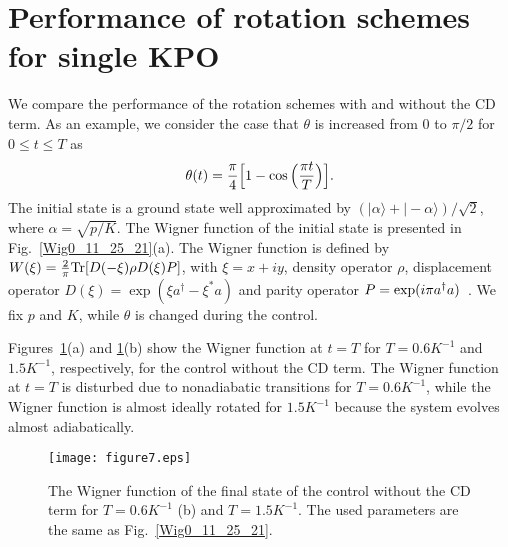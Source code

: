 \documentclass[%
 reprint,
 amsmath,amssymb,
 aps,
pra,
]{revtex4-2}
\begin{document}
\section{Performance of rotation schemes for single KPO}
\label{Rotation and disturbances due to nonadiabatic transitions}
We compare the performance of the rotation schemes with and without the CD term.
As an example, we consider the case that $\theta$ is increased from 0 to $\pi/2$ for $0\le t\le T$ as
\begin{eqnarray}
\theta(t) = \frac{\pi}{4}\Big{[} 1- \cos\Big{(} \frac{\pi t}{T} \Big{)} \Big{]}.
\label{theta0_11_29_21}
\end{eqnarray}
The initial state is a ground state well approximated by $(|\alpha\rangle + |-\alpha\rangle)/\sqrt{2}$, where $\alpha=\sqrt{p/K}$. 
The Wigner function of the initial state is presented in Fig.~\ref{Wig0_11_25_21}(a).
The Wigner function is defined by $W(\xi)=\frac{2}{\pi}{\rm Tr}[D(-\xi)\rho D(\xi)P]$, with $\xi=x+iy$, density operator $\rho$, displacement operator $D(\xi)=\exp(\xi a^\dagger - \xi^\ast a)$ and parity operator $P={\rm exp}(i\pi a^\dagger a)$~\cite{Leonhardt1997,Deleglise2008,Goto2016}.
We fix $p$ and $K$, while $\theta$ is changed during the control. %

Figures~\ref{Wig_11_25_21}(a) and \ref{Wig_11_25_21}(b) show the Wigner function at $t=T$ for $T=0.6K^{-1}$ and $1.5K^{-1}$, respectively, for the control without the CD term.
The Wigner function at $t=T$ is disturbed due to nonadiabatic transitions for $T=0.6K^{-1}$, while
the Wigner function is almost ideally rotated for $1.5K^{-1}$ because the system evolves almost adiabatically.
\begin{figure}[h!]
\begin{center}
\texttt{[image: figure7.eps]}
\end{center}
\caption{
The Wigner function of the final state of the control without the CD term
for $T=0.6K^{-1}$ (b) and $T=1.5K^{-1}$.
The used parameters are the same as Fig.~\ref{Wig0_11_25_21}.
}
\label{Wig_11_25_21}
\end{figure}
\end{document}
